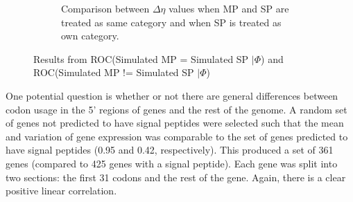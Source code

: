 \documentclass[11pt]{labbook}
\begin{document}
\begin{figure}
\begin{subfigure}{0.52\textwidth}
\caption{Comparison between $\Delta\eta$ values when MP and SP are treated as same category and when SP is treated as own category.}
\end{subfigure}
\caption{ Results from ROC(Simulated MP = Simulated SP $|\Phi$) and ROC(Simulated MP != Simulated SP $|\Phi$)}
\end{figure}


One potential question is whether or not there are general differences between codon usage in the 5' regions of genes and the rest of the genome. A random set of genes not predicted to have signal peptides were selected such that the mean and variation of gene expression was comparable to the set of genes predicted to have signal peptides (0.95 and 0.42, respectively). This produced a set of 361 genes (compared to 425 genes with a signal peptide). Each gene was split into two sections: the first 31 codons and the rest of the gene. Again, there is a clear positive linear correlation.  
\end{document}
